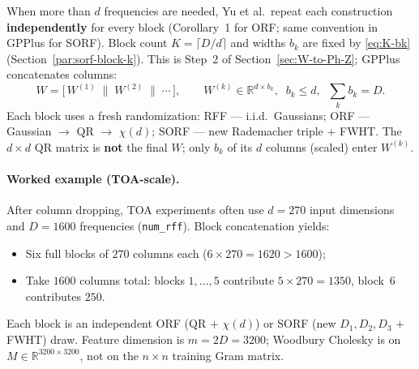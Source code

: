 \documentclass[11pt]{article}
\begin{document}
When more than $d$ frequencies are needed, Yu et al.\ repeat each construction
\textbf{independently} for every block (Corollary~1 for ORF; same convention in GPPlus for SORF).
Block count $K=\lceil D/d\rceil$ and widths $b_k$ are fixed by \eqref{eq:K-bk} (Section~\ref{par:sorf-block-k}).
This is Step~2 of Section~\ref{sec:W-to-Ph-Z}; GPPlus concatenates columns:
\begin{equation}
  W = \big[\, W^{(1)} \;\|\; W^{(2)} \;\|\; \cdots \,\big],
  \qquad W^{(k)} \in \mathbb{R}^{d\times b_k},
  \;\; b_k \le d,
  \;\; \sum_k b_k = D.
\end{equation}
Each block uses a fresh randomization: RFF --- i.i.d.\ Gaussians; ORF --- Gaussian $\to$ QR $\to$ $\chi(d)$; SORF --- new Rademacher triple + FWHT.
The $d\times d$ QR matrix is \textbf{not} the final $W$; only $b_k$ of its $d$ columns (scaled) enter $W^{(k)}$.

\paragraph{Worked example (TOA-scale).}
After column dropping, TOA experiments often use $d=270$ input dimensions and $D=1600$ frequencies (\texttt{num\_rff}).
Block concatenation yields:
\begin{itemize}
  \item Six full blocks of $270$ columns each ($6\times 270 = 1620 > 1600$);
  \item Take $1600$ columns total: blocks $1,\ldots,5$ contribute $5\times 270=1350$, block~$6$ contributes $250$.
\end{itemize}
Each block is an independent ORF (QR + $\chi(d)$) or SORF (new $D_1,D_2,D_3$ + FWHT) draw.
Feature dimension is $m=2D=3200$; Woodbury Cholesky is on $M\in\mathbb{R}^{3200\times 3200}$, not on the $n\times n$ training Gram matrix.
\end{document}
